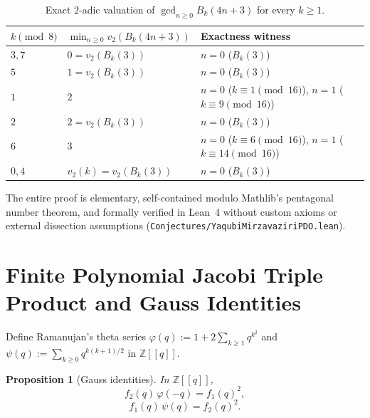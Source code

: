 \documentclass[11pt]{article}
\newtheorem{proposition}[theorem]{Proposition}
\begin{document}
\begin{table}[ht]
\centering
\small
\begin{tabular}{@{}lll@{}}
\toprule
$k \pmod 8$ & $\min_{n \ge 0} v_2(B_k(4n+3))$ & Exactness witness \\
\midrule
$3, 7$ & $0 = v_2(B_k(3))$ & $n = 0$ ($B_k(3)$) \\
$5$ & $1 = v_2(B_k(3))$ & $n = 0$ ($B_k(3)$) \\
$1$ & $2$ & $n = 0$ ($k \equiv 1 \pmod{16}$), $n = 1$ ($k \equiv 9 \pmod{16}$) \\
$2$ & $2 = v_2(B_k(3))$ & $n = 0$ ($B_k(3)$) \\
$6$ & $3$ & $n = 0$ ($k \equiv 6 \pmod{16}$), $n = 1$ ($k \equiv 14 \pmod{16}$) \\
$0, 4$ & $v_2(k) = v_2(B_k(3))$ & $n = 0$ ($B_k(3)$) \\
\bottomrule
\end{tabular}
\caption{Exact $2$-adic valuation of $\gcd_{n \ge 0} B_k(4n+3)$ for every $k \ge 1$.}
\label{tab:vals}
\end{table}

The entire proof is elementary, self-contained modulo Mathlib's pentagonal number theorem, and formally verified in Lean~4 without custom axioms or external dissection assumptions (\texttt{Conjectures/YaqubiMirzavaziriPDO.lean}).

\section{Finite Polynomial Jacobi Triple Product and Gauss Identities}

Define Ramanujan's theta series $\varphi(q) := 1 + 2\sum_{k \ge 1} q^{k^2}$ and $\psi(q) := \sum_{k \ge 0} q^{k(k+1)/2}$ in $\mathbb{Z}[[q]]$.

\begin{proposition}[Gauss identities]\label{prop:gauss}
In $\mathbb{Z}[[q]]$,
\begin{equation}\label{eq:J2}
f_2(q)\,\varphi(-q) = f_1(q)^2,
\end{equation}
\begin{equation}\label{eq:J1}
f_1(q)\,\psi(q) = f_2(q)^2.
\end{equation}
\end{proposition}
\end{document}
